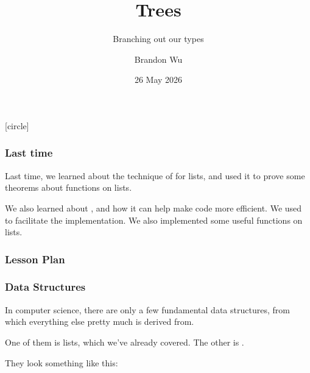 \documentclass[aspectratio=169]{beamer}
\title{Trees} %
\subtitle{Branching out our types} %
\date{26 May 2026} %
\author{Brandon Wu} %
\newif\ifcolorlambda
\begin{document}
\ifweb
    \renewcommand{\pause}{}
\fi

[circle]

{
\begin{frame}[plain]
    \colorlambdatrue
    \titlepage
\end{frame}
}

\begin{frame}[fragile]
  \frametitle{Last time}

  Last time, we learned about the technique of  for lists, and
  used it to prove some theorems about functions on lists.

  \vspace{\fill}

  We also learned about , and how it can help make code more efficient. We
  used  to facilitate the implementation. We also implemented some useful
  functions on lists.
\end{frame}

\begin{frame}[fragile]
  \frametitle{Lesson Plan}

  \tableofcontents
\end{frame}


\begin{frame}[fragile]
  \frametitle{Data Structures}

  In computer science, there are only a few fundamental data structures, from which everything
  else pretty much is derived from.

  \pause
  \vspace{\fill}

  One of them is lists, which we've already covered. The other is .

  \pause
  \vspace{\fill}


  \pause
  \vspace{\fill}

  They look something like this:

  \vspace{\fill}

  \begin{center}
  \end{center}
\end{frame}
\end{document}
